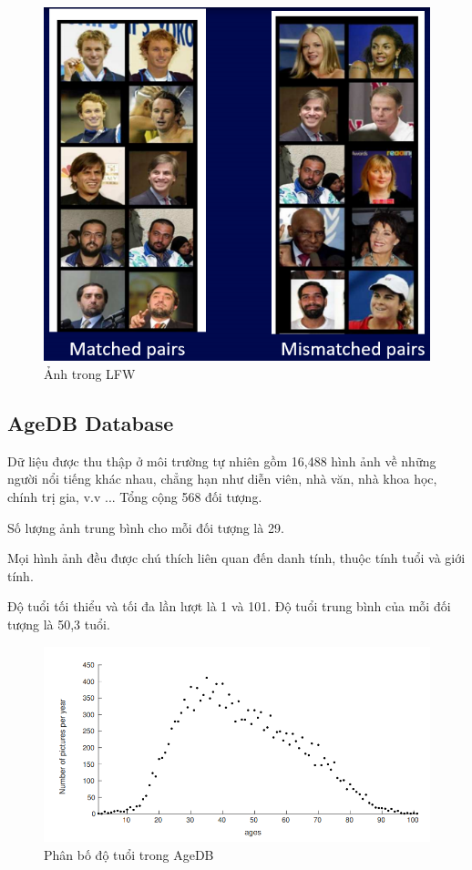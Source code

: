 \documentclass[a4paper, 12pt]{article}
\begin{document}
    \begin{figure}[H]
        \begin{center}
            \includegraphics[scale=0.5]{img/LFW.png}
            \caption{Ảnh trong LFW}
        \end{center}
    \end{figure}

\subsection{AgeDB Database}
Dữ liệu được thu thập ở môi trường tự nhiên gồm 16,488 hình ảnh về những người nổi tiếng khác nhau, chẳng hạn như diễn viên, nhà văn, nhà khoa học, chính trị gia, v.v ... Tổng cộng 568 đối tượng.

Số lượng ảnh trung bình cho mỗi đối tượng là 29.

Mọi hình ảnh đều được chú thích liên quan đến danh tính, thuộc tính tuổi và giới tính. 

Độ tuổi tối thiểu và tối đa lần lượt là 1 và 101. Độ tuổi trung bình của mỗi đối tượng là 50,3 tuổi. 

    \begin{figure}[H]
        \begin{center}
            \includegraphics[scale=0.45]{img/AgeDB1}
            \caption{Phân bố  độ tuổi trong AgeDB}
        \end{center}
    \end{figure}
\end{document}
